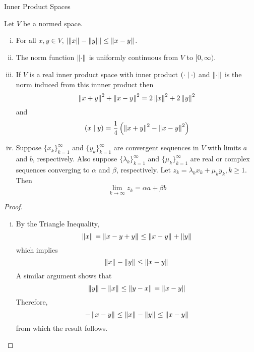\begin{section}{Inner Product Spaces}
\begin{prop}\label{prop:NormSpProperties}
	Let $V$ be a normed space.
		\begin{enumerate}[i)]
			\item
				For all $x,y \in V$, $\modulus{\norm[]{x}
				-\norm[]{y}} \leq \norm[]{x-y}$.
			\item
				The norm function $\norm[]{\cdot}$ is
				uniformly continuous from $V$ to $[0,\infty)$.
			\item
				If $V$ is a real inner product space with inner
				product $\innrprod{\cdot}{\cdot}$ and $\norm[]{\cdot}$
				is the norm induced from this innner product then
					\begin{displaymath}
						\norm[]{x+y}^2+\norm[]{x-y}^2 =
							2\norm[]{x}^2+2\norm[]{y}^2
					\end{displaymath}
				and
					\begin{displaymath}
						\innrprod{x}{y} = \frac{1}{4}\left(
							\norm[]{x+y}^2-\norm[]{x-y}^2\right)
					\end{displaymath}
			\item
				Suppose $\{x_k\}_{k=1}^\infty$ and 
				$\{y_k\}_{k=1}^\infty$ are convergent sequences
				in $V$ with limits $a$ and $b$, respectively. Also
				suppose $\{\lambda_k\}_{k=1}^\infty$
				and $\{\mu_k\}_{k=1}^\infty$ are real or complex
				sequences converging to $\alpha$ and
				$\beta$, respectively. Let $z_k = \lambda_k x_k +
				\mu_k y_k, k \geq 1$. Then
					\begin{displaymath}
						\lim_{k \rightarrow \infty} z_k =
							\alpha a + \beta b
					\end{displaymath}
		\end{enumerate}
\end{prop}

\begin{proof}
	\begin{enumerate}[i)]
	
		\item
			By the Triangle Inequality,
				\begin{displaymath}
					\norm[]{x} = \norm[]{x-y+y}
						\leq \norm[]{x-y}+\norm[]{y}
				\end{displaymath}
			which implies
				\begin{displaymath}
					\norm[]{x}-\norm[]{y} \leq \norm[]{x-y}
				\end{displaymath}
			A similar argument shows that
				\begin{displaymath}
					\norm[]{y}-\norm[]{x} \leq \norm[]{y-x}
						= \norm[]{x-y}
				\end{displaymath}
			Therefore,
				\begin{displaymath}
					-\norm[]{x-y} \leq \norm[]{x}-\norm[]{y} 
						\leq \norm[]{x-y}
				\end{displaymath}
			from which the result follows.
			

\end{enumerate}
\end{proof}
\end{section}
